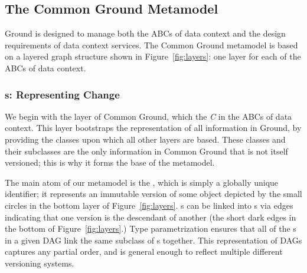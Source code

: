 \documentclass{sig-alternate}
\begin{document}
\subsection{The Common Ground Metamodel}
\label{sec:metamodel}
Ground is designed to manage both the ABCs of data context and the design requirements of data context services.
The Common Ground metamodel is based on a layered graph structure shown in Figure~\ref{fig:layers}: one layer for each of the ABCs of data context.


\subsubsection{{\Core}s: Representing Change}

We begin with the \core layer of Common Ground, which the \emph{C} in the ABCs of data context. 
This layer bootstraps the representation of all information in Ground, by providing the classes upon which all other layers are based. These classes and their subclasses are the only information in Common Ground that is not itself versioned; this is why it forms the base of the metamodel.

The main atom of our metamodel is the \version, which is simply a globally unique identifier; it represents an immutable version of some object
depicted by the small circles in the bottom layer of Figure~\ref{fig:layers}. 
{\version}s can be linked into s via  edges
indicating that one version is the descendant of another (the short dark edges in the bottom of Figure~\ref{fig:layers}.)
Type parametrization ensures that all of the s in a given DAG link the same subclass of {\version}s together.
This representation of DAGs captures any partial order, and is general enough to reflect multiple different versioning systems.
\end{document}
